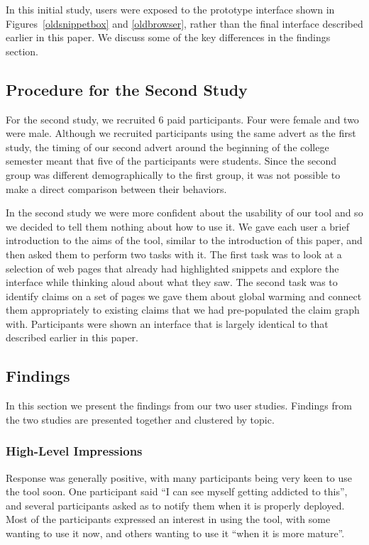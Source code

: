 \documentclass{chi2009}
\begin{document}
In this initial study, users were exposed to the prototype interface shown in Figures~\ref{oldsnippetbox} and \ref{oldbrowser}, rather than the final interface described earlier in this paper. We discuss some of the key differences in the findings section.

\subsection{Procedure for the Second Study}

For the second study, we recruited 6 paid participants. Four were female and two were male. Although we recruited participants using the same advert as the first study, the timing of our second advert around the beginning of the college semester meant that five of the participants were students. Since the second group was different demographically to the first group, it was not possible to make a direct comparison between their behaviors. 

In the second study we were more confident about the usability of our tool and so we decided to tell them nothing about how to use it. We gave each user a brief introduction to the aims of the tool, similar to the introduction of this paper, and then asked them to perform two tasks with it. The first task was to look at a selection of web pages that already had highlighted snippets and explore the interface while thinking aloud about what they saw. The second task was to identify claims on a set of pages we gave them about global warming and connect them appropriately to existing claims that we had pre-populated the claim graph with. Participants were shown an interface that is largely identical to that described earlier in this paper. 

\subsection{Findings}

In this section we present the findings from our two user studies. Findings from the two studies are presented together and clustered by topic.

\subsubsection{High-Level Impressions}

Response was generally positive, with many participants being very keen to use the tool soon. One participant said ``I can see myself getting addicted to this'', and several participants asked as to notify them when it is properly deployed. Most of the participants expressed an interest in using the tool, with some wanting to use it now, and others wanting to use it ``when it is more mature''.
\end{document}
